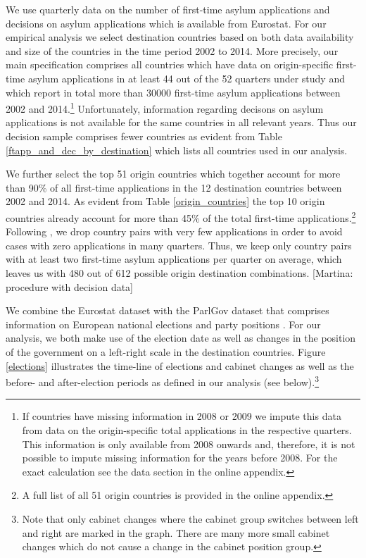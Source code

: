 \documentclass[a4paper,12pt]{article}
\begin{document}
We use quarterly data on the number of first-time asylum applications and decisions on asylum applications which is available from Eurostat. For our empirical analysis we select destination countries based on both data availability and size of the countries in the time period 2002 to 2014. More precisely, our main specification comprises all countries which have data on origin-specific first-time asylum applications in at least 44 out of the 52 quarters under study and which report in total more than 30000 first-time asylum applications between 2002 and 2014.\footnote{If countries have missing information in 2008 or 2009 we impute this data from data on the origin-specific total applications in the respective quarters. This information is only available from 2008 onwards and, therefore, it is not possible to impute missing information for the years before 2008. For the exact calculation see the data section in the online appendix.} Unfortunately, information regarding decisons on asylum applications is not available for the same countries in all relevant years. Thus our decision sample comprises fewer countries as evident from Table \ref{ftapp_and_dec_by_destination} which lists all countries used in our analysis.



We further select the top 51 origin countries which together account for more than 90\% of all first-time applications in the 12 destination countries between 2002 and 2014. As evident from Table \ref{origin_countries} the top 10 origin countries already account for more than 45\% of the total first-time applications.\footnote{A full list of all 51 origin countries is provided in the online appendix.} Following \cite{hatton2016}, we drop country pairs with very few applications in order to avoid cases with zero applications in many quarters. Thus, we keep only country pairs with at least two first-time asylum applications per quarter on average, which leaves us with 480 out of 612 possible origin destination combinations. [Martina: procedure with decision data]



We combine the Eurostat dataset with the ParlGov dataset that comprises information on European national elections and party positions \citep{parlgov2016}. For our analysis, we both make use of the election date as well as changes in the position of the government on a left-right scale in the destination countries. Figure \ref{elections} illustrates the time-line of elections and cabinet changes as well as the before- and after-election periods as defined in our analysis (see below).\footnote{Note that only cabinet changes where the cabinet group switches between left and right are marked in the graph. There are many more small cabinet changes which do not cause a change in the cabinet position group.}
\end{document}
